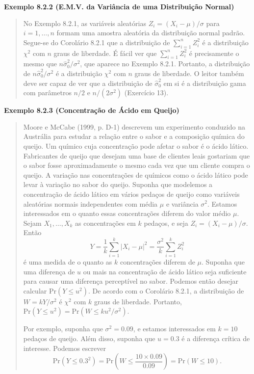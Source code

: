 \vspace{1em}
\noindent\textbf{Exemplo 8.2.2 (E.M.V. da Variância de uma Distribuição Normal)}
\begin{quote}
    No Exemplo 8.2.1, as variáveis aleatórias $Z_i = (X_i - \mu)/\sigma$ para $i=1, \dots, n$ formam uma amostra aleatória da distribuição normal padrão. Segue-se do Corolário 8.2.1 que a distribuição de $\sum_{i=1}^n Z_i^2$ é a distribuição $\chi^2$ com $n$ graus de liberdade. É fácil ver que $\sum_{i=1}^n Z_i^2$ é precisamente o mesmo que $n\hat{\sigma}_0^2/\sigma^2$, que aparece no Exemplo 8.2.1. Portanto, a distribuição de $n\hat{\sigma}_0^2/\sigma^2$ é a distribuição $\chi^2$ com $n$ graus de liberdade. O leitor também deve ser capaz de ver que a distribuição de $\hat{\sigma}_0^2$ em si é a distribuição gama com parâmetros $n/2$ e $n/(2\sigma^2)$ (Exercício 13).
\end{quote}
\vspace{1em}

\vspace{1em}
\noindent\textbf{Exemplo 8.2.3 (Concentração de Ácido em Queijo)}
\begin{quote}
    Moore e McCabe (1999, p. D-1) descrevem um experimento conduzido na Austrália para estudar a relação entre o sabor e a composição química do queijo. Um químico cuja concentração pode afetar o sabor é o ácido lático. Fabricantes de queijo que desejam uma base de clientes leais gostariam que o sabor fosse aproximadamente o mesmo cada vez que um cliente compra o queijo. A variação nas concentrações de químicos como o ácido lático pode levar à variação no sabor do queijo. Suponha que modelemos a concentração de ácido lático em vários pedaços de queijo como variáveis aleatórias normais independentes com média $\mu$ e variância $\sigma^2$. Estamos interessados em o quanto essas concentrações diferem do valor médio $\mu$. Sejam $X_1, \dots, X_k$ as concentrações em $k$ pedaços, e seja $Z_i = (X_i - \mu)/\sigma$. Então
    $$
    Y = \frac{1}{k}\sum_{i=1}^{k} |X_i - \mu|^2 = \frac{\sigma^2}{k}\sum_{i=1}^{k} Z_i^2
    $$
    é uma medida de o quanto as $k$ concentrações diferem de $\mu$. Suponha que uma diferença de $u$ ou mais na concentração de ácido lático seja suficiente para causar uma diferença perceptível no sabor. Podemos então desejar calcular $\text{Pr}(Y \le u^2)$. De acordo com o Corolário 8.2.1, a distribuição de $W = kY/\sigma^2$ é $\chi^2$ com $k$ graus de liberdade. Portanto, $\text{Pr}(Y \le u^2) = \text{Pr}(W \le ku^2/\sigma^2)$.

    Por exemplo, suponha que $\sigma^2=0.09$, e estamos interessados em $k=10$ pedaços de queijo. Além disso, suponha que $u=0.3$ é a diferença crítica de interesse. Podemos escrever
    \begin{equation}
        \text{Pr}(Y \le 0.3^2) = \text{Pr}\left(W \le \frac{10 \times 0.09}{0.09}\right) = \text{Pr}(W \le 10).
    \end{equation}
\end{quote}
\vspace{1em}

